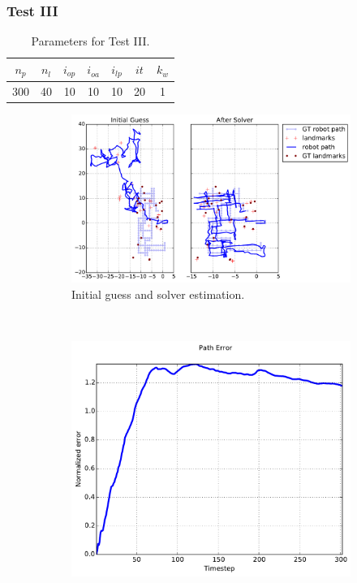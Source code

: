 \subsubsection{Test III}
\label{sec:test-iii}

\begin{table}[htbp!]
    \centering
    \begin{tabular}{|c|c|c|c|c|c|c|}
        \hline
        $n_p$ & $n_l$ & $i_{op}$ & $i_{oa}$ & $i_{lp}$ & $it$ & $k_w$\\
        \hline \hline
        300 & 40 & 10 & 10 & 10 & 20 & 1\\
        \hline 
    \end{tabular}
    \caption{Parameters for Test III.}
    \label{tab:test-iii}
\end{table}

\begin{figure}[htbp!]
    \centering
    \begin{subfigure}[b]{\estWidth\textwidth}
        \includegraphics[width=\textwidth]{imagenes/tests/known/res_it_20_nl_40_op_10_oa_10_lp_10_ds_300_kw_1.pdf}
        \caption{Initial guess and solver estimation.}
        \label{fig:test-iiia}
    \end{subfigure}\\
    \begin{subfigure}[b]{\errorWidth\textwidth}
        \includegraphics[width=\textwidth]{imagenes/tests/known/res_it_20_nl_40_op_10_oa_10_lp_10_ds_300_kw_1_path.pdf}

\end{subfigure}
\end{figure}
